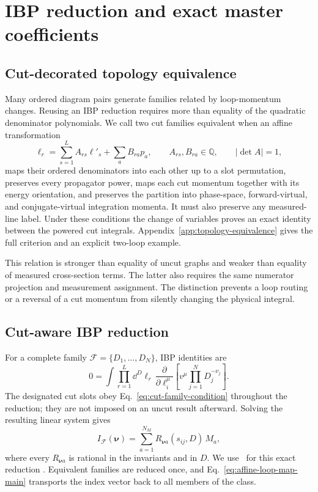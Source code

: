 \section{IBP reduction and exact master coefficients}
\label{sec:ibp-coefficients}

\subsection{Cut-decorated topology equivalence}

Many ordered diagram pairs generate families related by loop-momentum
changes.  Reusing an IBP reduction requires more than equality of the
quadratic denominator polynomials.  We call two cut families equivalent when
an affine transformation
\begin{equation}
 \ell_r=\sum_{s=1}^{L}A_{rs}\ell'_s+\sum_aB_{ra}p_a,
 \qquad A_{rs},B_{ra}\in\mathbb Q,
 \qquad |\det A|=1,
 \label{eq:affine-loop-map-main}
\end{equation}
maps their ordered denominators into each other up to a slot permutation,
preserves every propagator power, maps each cut momentum together with its
energy orientation, and preserves the partition into phase-space,
forward-virtual, and conjugate-virtual integration momenta.  It must also
preserve any measured-line label.  Under these conditions the change of
variables proves an exact identity between the powered cut integrals.
Appendix~\ref{app:topology-equivalence} gives the full criterion and an
explicit two-loop example.

This relation is stronger than equality of uncut graphs and weaker than
equality of measured cross-section terms.  The latter also requires the same
numerator projection and measurement assignment.  The distinction prevents a
loop routing or a reversal of a cut momentum from silently changing the
physical integral.

\subsection{Cut-aware IBP reduction}

For a complete family $\mathcal F=\{D_1,\ldots,D_N\}$, IBP identities are
\begin{equation}
 0=\int\prod_{r=1}^{L}\dd^D\ell_r\,
 \frac{\partial}{\partial\ell_i^\mu}
 \left[v^\mu\prod_{j=1}^{N}D_j^{-\nu_j}\right].
 \label{eq:ibp-identity}
\end{equation}
The designated cut slots obey Eq.~\eqref{eq:cut-family-condition} throughout
the reduction; they are not imposed on an uncut result afterward.  Solving
the resulting linear system gives
\begin{equation}
 I_{\mathcal F}(\boldsymbol\nu)
 =\sum_{a=1}^{N_M}
 R_{\boldsymbol\nu a}(s_{ij},D)\,M_a,
 \label{eq:ibp-reduction}
\end{equation}
where every $R_{\boldsymbol\nu a}$ is rational in the invariants and in
$D$.  We use \Kira\ for this exact reduction
\cite{Maierhofer:2017gsa,Klappert:2020nbg}.  Equivalent families are reduced
once, and Eq.~\eqref{eq:affine-loop-map-main} transports the index vector back
to all members of the class.

